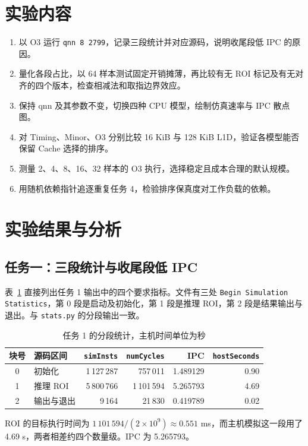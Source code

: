 \documentclass[12pt,a4paper,fontset=mac]{ctexart}
\begin{document}
\section{实验内容}
\begin{enumerate}
\item 以 O3 运行 \texttt{qnn 8 2799}，记录三段统计并对应源码，说明收尾段低 IPC 的原因。
\item 量化各段占比，以 64 样本测试固定开销摊薄，再比较有无 ROI 标记及有无对齐的四个版本，检查相减法和取指边界效应。
\item 保持 qnn 及其参数不变，切换四种 CPU 模型，绘制仿真速率与 IPC 散点图。
\item 对 Timing、Minor、O3 分别比较 16 KiB 与 128 KiB L1D，验证各模型能否保留 Cache 选择的排序。
\item 测量 2、4、8、16、32 样本的 O3 执行，选择稳定且成本合理的默认规模。
\item 用随机依赖指针追逐重复任务 4，检验排序保真度对工作负载的依赖。
\end{enumerate}

\section{实验结果与分析}
\subsection{任务一：三段统计与收尾段低 IPC}
表~\ref{tab:task1} 直接列出任务 1 输出中的四个要求指标。文件有三处 \texttt{Begin Simulation Statistics}，第 0 段是启动及初始化，第 1 段是推理 ROI，第 2 段是结果输出与退出。与 \texttt{stats.py} 的分段输出一致。
\begin{table}[H]\centering\small
\caption{任务 1 的分段统计，主机时间单位为秒}\label{tab:task1}
\begin{tabular}{clrrrr}\toprule
块号 & 源码区间 & \texttt{simInsts} & \texttt{numCycles} & IPC & \texttt{hostSeconds} \\\midrule
0 & 初始化 & 1\,127\,287 & 757\,011 & 1.489129 & 0.90 \\
1 & 推理 ROI & 5\,800\,766 & 1\,101\,594 & 5.265793 & 4.69 \\
2 & 输出与退出 & 9\,164 & 21\,830 & 0.419789 & 0.02 \\
\bottomrule\end{tabular}\end{table}

ROI 的目标执行时间为 $1\,101\,594/(2\times10^9)\approx0.551$ ms，而主机模拟这一段用了 4.69 s，两者相差约四个数量级。IPC 为 5.265793。
\end{document}
